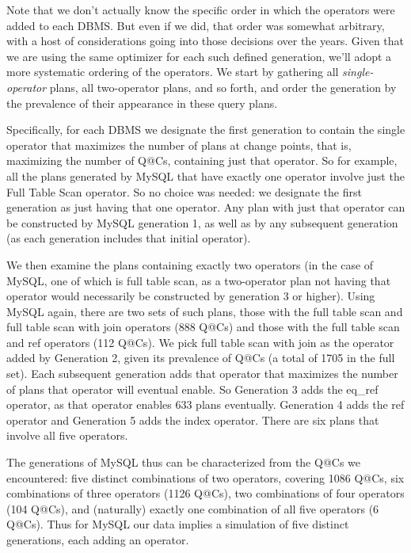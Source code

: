 \documentclass[prodmode,acmtods]{acmsmall}
\begin{document}
Note that we don't actually know the specific order in which the operators
were added to each \hbox{DBMS}. But even if we did, that order was somewhat
arbitrary, with a host of considerations going into those decisions over the
years. Given that we are using the same optimizer for each such defined
generation, we'll adopt a more systematic ordering of the operators. We
start by gathering all {\em single-operator} plans, all two-operator plans,
and so forth, and order the generation by the prevalence of their
\hbox{appearance} in these query plans.

Specifically, for each \hbox{DBMS} we designate the first
generation to contain the single operator that maximizes the number of plans
at change points, that is, maximizing the number of Q@Cs, containing just that
operator. So for example, all the plans generated by MySQL that have exactly
one operator involve just the Full Table Scan operator.  So no choice was
needed: we designate the
first generation as just having that one operator. Any plan with just that
operator can be constructed by MySQL generation 1, as well as by any
subsequent generation (as each generation includes that initial operator).

We then examine the plans containing exactly two operators (in the case of
MySQL, one of which is
full table scan, as a two-operator plan not having that operator would
necessarily be constructed by generation 3 or higher). Using MySQL again, there are two sets of
such plans, those with the full table scan and full table scan with join
operators (888 Q@Cs) and
those with the full table scan and ref operators (112 Q@Cs). We pick full
table scan with join as the operator added by Generation 2, given its
prevalence of Q@Cs (a total of 1705 in the full set). Each
subsequent generation adds that operator that maximizes the number of plans
that operator will eventual enable. So Generation 3 adds the eq\_ref operator,
as that operator enables 633 plans eventually. Generation 4 adds the ref
operator and Generation 5 adds the index operator. There are six plans that
involve all five operators.

The generations of MySQL thus can be characterized from the Q@Cs we encountered: five distinct combinations of two
operators, covering 1086 Q@Cs, six combinations of three operators (1126 Q@Cs),
two combinations of four operators (104 Q@Cs), and (naturally) exactly one
combination of all five operators (6 Q@Cs). Thus for MySQL our data implies
a simulation of five distinct generations, each adding an operator.
\end{document}
